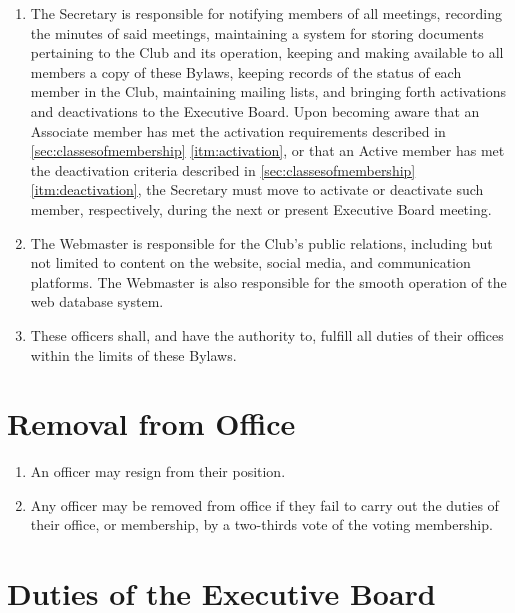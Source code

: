 \documentclass[12pt,letterpaper]{book}
\begin{document}
\begin{enumerate}
\item The Secretary is responsible for notifying members of all meetings, recording the minutes of said meetings, maintaining a system for storing documents pertaining to the Club and its operation, keeping and making available to all members a copy of these Bylaws, keeping records of the status of each member in the Club, maintaining mailing lists, and bringing forth activations and deactivations to the Executive Board. Upon becoming aware that an Associate member has met the activation requirements described in \cref{sec:classesofmembership} \cref{itm:activation}, or that an Active member has met the deactivation criteria described in \cref{sec:classesofmembership} \cref{itm:deactivation}, the Secretary must move to activate or deactivate such member, respectively, during the next or present Executive Board meeting.
\item The Webmaster is responsible for the Club’s public relations, including but not limited to content on the website, social media, and communication platforms. The Webmaster is also responsible for the smooth operation of the web database system.
\item These officers shall, and have the authority to, fulfill all duties of their offices within the limits of these Bylaws.

\end{enumerate}

\section{Removal from Office}

\begin{enumerate}

\item An officer may resign from their position.
\item Any officer may be removed from office if they fail to carry out the duties of their office, or membership, by a two-thirds vote of the voting membership.

\end{enumerate}

\section{Duties of the Executive Board}
\end{document}
